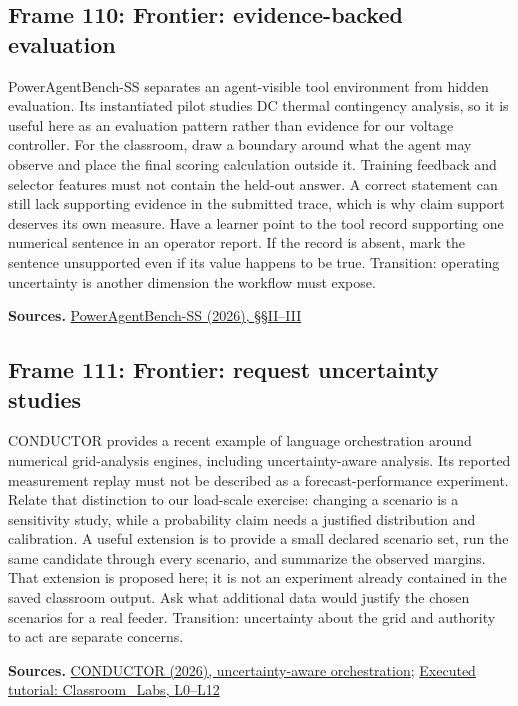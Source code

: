 \documentclass[11pt]{article}
\begin{document}
\subsection*{Frame 110: Frontier: evidence-backed evaluation}
PowerAgentBench-SS separates an agent-visible tool environment from hidden evaluation. Its instantiated pilot studies DC thermal contingency analysis, so it is useful here as an evaluation pattern rather than evidence for our voltage controller. For the classroom, draw a boundary around what the agent may observe and place the final scoring calculation outside it. Training feedback and selector features must not contain the held-out answer. A correct statement can still lack supporting evidence in the submitted trace, which is why claim support deserves its own measure. Have a learner point to the tool record supporting one numerical sentence in an operator report. If the record is absent, mark the sentence unsupported even if its value happens to be true. Transition: operating uncertainty is another dimension the workflow must expose.\par
\par\nopagebreak\begin{minipage}{\linewidth}{\footnotesize\color{slate}\textbf{Sources.} \href{https://arxiv.org/html/2606.18789v1}{PowerAgentBench-SS (2026), \S{}\S{}II--III}\par}\end{minipage}\par\medskip
\subsection*{Frame 111: Frontier: request uncertainty studies}
CONDUCTOR provides a recent example of language orchestration around numerical grid-analysis engines, including uncertainty-aware analysis. Its reported measurement replay must not be described as a forecast-performance experiment. Relate that distinction to our load-scale exercise: changing a scenario is a sensitivity study, while a probability claim needs a justified distribution and calibration. A useful extension is to provide a small declared scenario set, run the same candidate through every scenario, and summarize the observed margins. That extension is proposed here; it is not an experiment already contained in the saved classroom output. Ask what additional data would justify the chosen scenarios for a real feeder. Transition: uncertainty about the grid and authority to act are separate concerns.\par
\par\nopagebreak\begin{minipage}{\linewidth}{\footnotesize\color{slate}\textbf{Sources.} \href{https://arxiv.org/html/2606.24609v1}{CONDUCTOR (2026), uncertainty-aware orchestration}; \href{../Classroom_Labs.html}{Executed tutorial: Classroom\_Labs, L0--L12}\par}\end{minipage}\par\medskip
\end{document}
